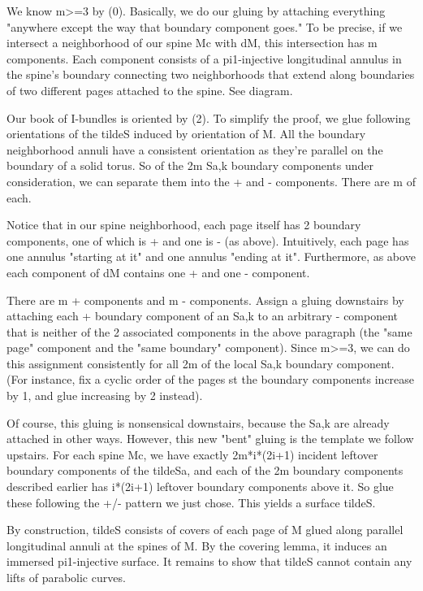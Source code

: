\documentclass[12pt]{amsart}
\theoremstyle{definition}
\theoremstyle{remark}
\begin{document}
We know m>=3 by (0). Basically, we do our gluing by attaching everything
"anywhere except the way that boundary component goes." To be precise, if we
intersect a neighborhood of our spine Mc with dM, this intersection has
m components. Each component consists of a pi1-injective longitudinal annulus
in the spine's boundary connecting two neighborhoods that extend along
boundaries of two different pages attached to the spine. See diagram.

Our book of I-bundles is oriented by (2). To simplify the proof, we glue
following orientations of the tildeS induced by orientation of M. All the
boundary neighborhood annuli have a consistent orientation as they're parallel
on the boundary of a solid torus. So of the 2m Sa,k boundary components under
consideration, we can separate them into the + and - components. There are m of
each.

Notice that in our spine neighborhood, each page itself has 2 boundary
components, one of which is + and one is - (as above). Intuitively, each page
has one annulus "starting at it" and one annulus "ending at it". Furthermore,
as above each component of dM contains one + and one - component.

There are m + components and m - components. Assign a gluing downstairs by
attaching each + boundary component of an Sa,k to an arbitrary - component that
is neither of the 2 associated components in the above paragraph (the "same
page" component and the "same boundary" component). Since m>=3, we can do this
assignment consistently for all 2m of the local Sa,k boundary component. (For
instance, fix a cyclic order of the pages st the boundary components increase
by 1, and glue increasing by 2 instead).

Of course, this gluing is nonsensical downstairs, because the Sa,k are already
attached in other ways. However, this new "bent" gluing is the template we
follow upstairs. For each spine Mc, we have exactly 2m*i*(2i+1) incident
leftover boundary components of the tildeSa, and each of the 2m boundary
components described earlier has i*(2i+1) leftover boundary components above
it. So glue these following the +/- pattern we just chose. This yields
a surface tildeS.

By construction, tildeS consists of covers of each page of M glued along
parallel longitudinal annuli at the spines of M. By the covering lemma, it
induces an immersed pi1-injective surface. It remains to show that tildeS
cannot contain any lifts of parabolic curves.
\end{document}
